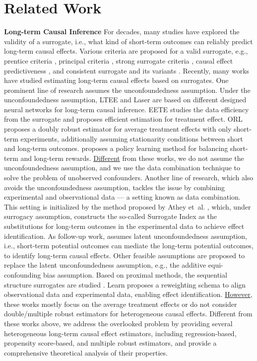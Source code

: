 \section{Related Work}
\textbf{Long-term Causal Inference}
For decades, many studies have explored the validity of a surrogate, i.e., what kind of short-term outcomes can reliably predict long-term causal effects. 
Various criteria are proposed for a valid surrogate, e.g., prentice criteria \cite{prentice1989surrogate}, principal criteria \cite{frangakis2002principal}, strong surrogate criteria \cite{lauritzen2004discussion}, causal effect predictiveness \cite{gilbert2008evaluating}, and consistent surrogate and its variants \cite{chen2007criteria, ju2010criteria, yin2020novel}.
Recently, many works have studied estimating long-term causal effects based on surrogates. 
One prominent line of research assumes the unconfoundedness assumption.
Under the unconfoundedness assumption, LTEE \cite{cheng2021long} and Laser \cite{cai2024long} are based on different designed neural networks for long-term causal inference.
EETE \cite{kallus2020role} studies the data efficiency from the surrogate and proposes efficient estimation for treatment effect.
ORL \cite{tran2023inferring} proposes a doubly robust estimator for average treatment effects with only short-term experiments, additionally assuming stationarity conditions between short and long-term outcomes.
\cite{wu2024policy} proposes a policy learning method for balancing short-term and long-term rewards.
\underline{Different} from these works, we do not assume the unconfoundedness assumption, and we use the data combination technique to solve the problem of unobserved confounders.
Another line of research, which also avoids the unconfoundedness assumption, tackles the issue by combining experimental and observational data — a setting known as data combination.
This setting is initialized by the method proposed by Athey et~al. \cite{athey2019surrogate}, 
which, under surrogacy assumption, constructs the so-called Surrogate Index as the substitutions for long-term outcomes in the experimental data to achieve effect identification.
As follow-up work, \cite{athey2020combining} assumes latent unconfoundedness assumption, i.e., short-term potential outcomes can mediate the long-term potential outcomes, to identify long-term causal effects.
Other feasible assumptions \cite{ghassami2022combining}  are proposed to replace the latent unconfoundedness assumption, e.g., the additive equi-confounding bias assumption.
Based on proximal methods, the sequential structure surrogates are studied \cite{imbens2022long}.
Learn \cite{yang2024estimating} proposes a reweighting schema to align observational data and experimental data, enabling effect identification.
\underline{However}, these works mostly focus on the average treatment effects or do not consider double/multiple robust estimators for heterogeneous causal effects.
Different from these works above, we address the overlooked problem by providing several heterogeneous long-term causal effect estimators, including regression-based, propensity score-based, and multiple robust estimators, and provide a comprehensive theoretical analysis of their properties.

